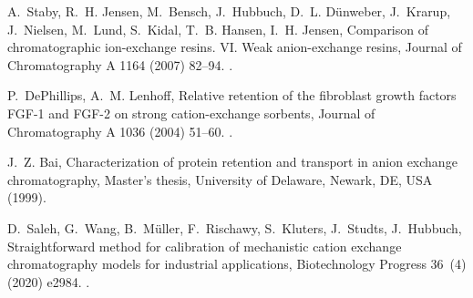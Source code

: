 \documentclass[preprint,review,12pt]{elsarticle}
\begin{document}
\begin{thebibliography}{10}
A.~Staby, R.~H. Jensen, M.~Bensch, J.~Hubbuch, D.~L. D{\"{u}}nweber, J.~Krarup,
  J.~Nielsen, M.~Lund, S.~Kidal, T.~B. Hansen, I.~H. Jensen, {Comparison of
  chromatographic ion-exchange resins. VI. Weak anion-exchange resins}, Journal
  of Chromatography A 1164 (2007) 82--94.
\newblock \href {https://doi.org/10.1016/j.chroma.2007.06.048}
  {}.

P.~DePhillips, A.~M. Lenhoff, {Relative retention of the fibroblast growth
  factors FGF-1 and FGF-2 on strong cation-exchange sorbents}, Journal of
  Chromatography A 1036 (2004) 51--60.
\newblock \href {https://doi.org/10.1016/j.chroma.2004.01.012}
  {}.

J.~Z. Bai, {Characterization of protein retention and transport in anion
  exchange chromatography}, Master's thesis, University of Delaware, Newark,
  DE, USA (1999).

D.~Saleh, G.~Wang, B.~M{\"{u}}ller, F.~Rischawy, S.~Kluters, J.~Studts,
  J.~Hubbuch, {Straightforward method for calibration of mechanistic cation
  exchange chromatography models for industrial applications}, Biotechnology
  Progress 36~(4) (2020) e2984.
\newblock \href {https://doi.org/10.1002/btpr.2984}
  {}.

\end{thebibliography}
\end{document}

